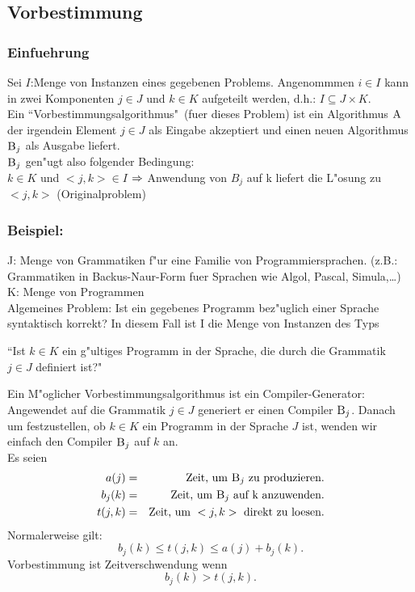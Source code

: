 \documentclass[a4paper]{scrartcl}
\begin{document}
\subsection{Vorbestimmung}
\subsubsection*{Einfuehrung}
Sei $I$:Menge von Instanzen eines gegebenen Problems. Angenommmen $i \in I$ kann in zwei Komponenten $j \in J$ und $k \in K$ aufgeteilt werden, d.h.: $I \subseteq J \times K$.\\
Ein ``Vorbestimmungsalgorithmus"\ (fuer dieses Problem) ist ein Algorithmus $\textnormal{\scshape A}$ der irgendein Element $j\in J$ als Eingabe akzeptiert und einen neuen Algorithmus $\textnormal{\scshape B}_j$ als Ausgabe liefert. \\

$\textnormal{\scshape B}_j$ gen"ugt also folgender Bedingung:\\ 
$k\in K$ und $<j,k>\in I$ $\Rightarrow$ Anwendung von $B_j$ auf k liefert die L"osung zu $<j,k>$ (Originalproblem)\\

\subsubsection*{Beispiel:}

J: Menge von Grammatiken f"ur eine Familie von Programmiersprachen. (z.B.: Grammatiken in Backus-Naur-Form fuer Sprachen wie Algol, Pascal, Simula,\dots) \\
K: Menge von Programmen \\

Algemeines Problem: Ist ein gegebenes Programm bez"uglich einer Sprache syntaktisch korrekt? In diesem Fall ist I die Menge von Instanzen des Typs\\
\begin{center}
	 ``Ist $k \in K$ ein g"ultiges Programm in der Sprache, die durch die Grammatik $j \in J$ definiert ist?"\\
\end{center}
Ein M"oglicher Vorbestimmungsalgorithmus ist ein Compiler-Generator:\\
Angewendet auf die Grammatik $j \in J$ generiert er einen Compiler $\textnormal{\scshape B}_j$. Danach um festzustellen, ob $k\in K$ ein Programm in der Sprache $J$ ist, wenden wir einfach den Compiler $\textnormal{\scshape B}_j$ auf $k$ an.\\
Es seien 
\begin{eqnarray*}
  a(j)   & = & \text{Zeit, um }\textnormal{\scshape B}_j\text{ zu produzieren.}\\
  b_j(k)   & = & \text{Zeit, um }\textnormal{\scshape B}_j\text{ auf k anzuwenden.}\\
  t(j,k) & = & \text{Zeit, um }<j,k>\text{ direkt zu loesen.}
\end{eqnarray*}
Normalerweise gilt:
	$$b_j(k)\le t(j,k) \le a(j)+b_j(k).$$
Vorbestimmung ist Zeitverschwendung wenn $$b_j(k) > t(j,k).$$
\end{document}
